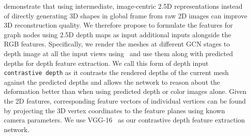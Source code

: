 \cite{yao2020front2back} demonstrate that using intermediate, image-centric 2.5D representations instead of directly generating 3D shapes in global frame from raw 2D images can improve 3D reconstruction quality.
We therefore propose to formulate the features for graph nodes using 2.5D depth maps as input additional inputs alongside the RGB features.
Specifically, we render the meshes at different GCN stages to depth image at all the input views using~\cite{kato2018renderer} and use them along with predicted depths for depth feature extraction. We call this form of depth input \texttt{contrastive depth} as it contrasts the rendered depths of the current mesh against the predicted depths and allows the network to reason about the deformation better than when using predicted depth or color images alone.
Given the 2D features, corresponding feature vectors of individual vertices can be found by projecting the 3D vertex coordinates to the feature planes using known camera parameters.
We use VGG-16~\cite{simonyan2014vgg} as our contrastive depth feature extraction network.


